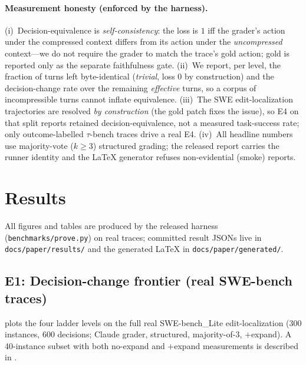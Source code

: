 \documentclass[11pt]{article}
\begin{document}
\paragraph{Measurement honesty (enforced by the harness).} (i)~Decision-equivalence
is \emph{self-consistency}: the loss is $1$ iff the grader's action under the
compressed context differs from its action under the \emph{uncompressed} context---we
do not require the grader to match the trace's gold action; gold is reported only as
the separate faithfulness gate. (ii)~We report, per level, the fraction of turns left
byte-identical (\emph{trivial}, loss $0$ by construction) and the decision-change rate
over the remaining \emph{effective} turns, so a corpus of incompressible turns cannot
inflate equivalence. (iii)~The SWE edit-localization trajectories are resolved
\emph{by construction} (the gold patch fixes the issue), so E4 on that split reports
retained decision-equivalence, not a measured task-success rate; only
outcome-labelled $\tau$-bench traces drive a real E4. (iv)~All headline
numbers use majority-vote ($k{\ge}3$) structured grading; the released report carries
the runner identity and the LaTeX generator refuses non-evidential (smoke) reports.

\section{Results}
\label{sec:results}
{\sloppy
All figures and tables are produced by the released harness
(\texttt{benchmarks/prove.py}) on real traces; committed result JSONs live in
\texttt{docs/paper/results/} and the generated LaTeX in
\texttt{docs/paper/generated/}.\par}

\subsection{E1: Decision-change frontier (real SWE-bench traces)}

 plots the four ladder levels on the full real SWE-bench\_Lite
edit-localization (300 instances, 600 decisions; Claude grader, structured,
majority-of-3, $+$expand). A 40-instance subset with both no-expand and $+$expand
measurements is described in .
\end{document}
